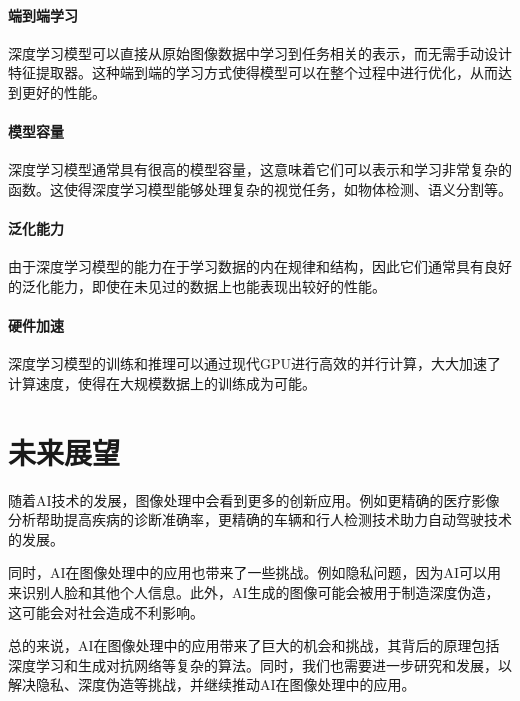 \documentclass{article}
\begin{document}
\paragraph{端到端学习}
深度学习模型可以直接从原始图像数据中学习到任务相关的表示，而无需手动设计特征提取器。这种端到端的学习方式使得模型可以在整个过程中进行优化，从而达到更好的性能。

\paragraph{模型容量}
深度学习模型通常具有很高的模型容量，这意味着它们可以表示和学习非常复杂的函数。这使得深度学习模型能够处理复杂的视觉任务，如物体检测、语义分割等。

\paragraph{泛化能力}
由于深度学习模型的能力在于学习数据的内在规律和结构，因此它们通常具有良好的泛化能力，即使在未见过的数据上也能表现出较好的性能。

\paragraph{硬件加速}
深度学习模型的训练和推理可以通过现代GPU进行高效的并行计算，大大加速了计算速度，使得在大规模数据上的训练成为可能。

\section{未来展望}
随着AI技术的发展，图像处理中会看到更多的创新应用。例如更精确的医疗影像分析帮助提高疾病的诊断准确率，更精确的车辆和行人检测技术助力自动驾驶技术的发展。

同时，AI在图像处理中的应用也带来了一些挑战。例如隐私问题，因为AI可以用来识别人脸和其他个人信息。此外，AI生成的图像可能会被用于制造深度伪造，这可能会对社会造成不利影响。

总的来说，AI在图像处理中的应用带来了巨大的机会和挑战，其背后的原理包括深度学习和生成对抗网络等复杂的算法。同时，我们也需要进一步研究和发展，以解决隐私、深度伪造等挑战，并继续推动AI在图像处理中的应用。
\end{document}
